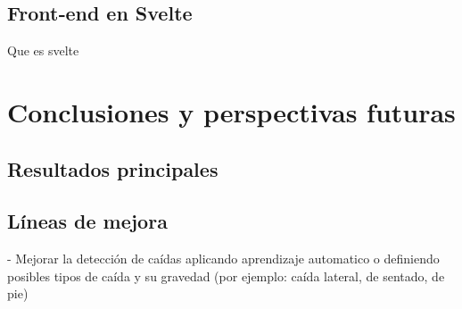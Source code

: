 \documentclass[12pt, a4paper]{article}
\begin{document}
\subsection{Front‑end en Svelte} Que es svelte 




\section{Conclusiones y perspectivas futuras}
	\subsection{Resultados principales}
	\subsection{Líneas de mejora}
	
	- Mejorar la detección de caídas aplicando aprendizaje automatico o definiendo posibles tipos de caída y su gravedad (por ejemplo: caída lateral, de sentado, de pie)  
\end{document}
